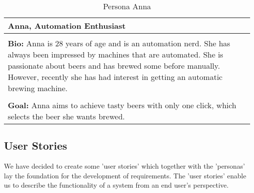 \begin{table}[htb]
    \begin{center}
        \begin{tabular}{|p{16cm}|}
            \hline
            \textbf{Anna, Automation Enthusiast}                                                                                                                                                              \\
            \hline
            \\ \textbf{Bio:} Anna is 28 years of age and is an automation nerd. She has always been impressed by machines that are automated. She is passionate about beers and has brewed some before manually. However, recently she has had interest in getting an automatic brewing machine.  \\
            \\
            \textbf{Goal:} Anna aims to achieve tasty beers with only one click, which selects the beer she wants brewed.\\
            \hline
        \end{tabular}
        \caption{Persona Anna}
        \label{tab:persona_anna}
    \end{center}
\end{table}

\subsection{User Stories}

We have decided to create some 'user stories' which together with the 'personas' lay the foundation for the development of requirements.
The 'user stories' enable us to describe the functionality of a system from an end user's perspective.

